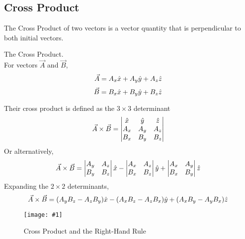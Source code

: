 \documentclass[11pt]{article}
\newcommand{\fig}[4]{
    \begin{figure}[H]
        \centering
        \texttt{[image: \#1]}
        \caption{#2}
        \label{exp4fit}
    \end{figure}
}
\theoremstyle{gangnamstyle}{\newtheorem{definition}{Definition}[]}
\theoremstyle{gangnamstyle}{\newtheorem{example}{Example}[]}
\theoremstyle{gangnamstyle}{\newtheorem{problem}{Problem}[]}
\begin{document}
\subsection{Cross Product}

The Cross Product of two vectors is a vector quantity that is perpendicular to both initial vectors. 

\begin{definition}
The Cross Product. \\
For vectors $\Vec{A}$ and $\Vec{B}$, 
\begin{equation}
\Vec{A} = A_x\Hat{x} + A_y\Hat{y} + A_z\Hat{z}
\end{equation}
\begin{equation}
\Vec{B} = B_x\Hat{x} + B_y\Hat{y} + B_z\Hat{z}
\end{equation}

Their cross product is defined as the $3 \times 3$ determinant
\begin{equation}
\Vec{A} \times \Vec{B} = 
\begin{vmatrix}
\Hat{x} & \Hat{y} & \Hat{z} \\
A_x & A_y & A_z \\
B_x & B_y & B_z
\end{vmatrix}
\end{equation}
Or alternatively, 
\begin{equation}
\Vec{A} \times \Vec{B} = 
\begin{vmatrix}
A_y & A_z \\
B_y & B_z
\end{vmatrix} \Hat{x}
- 
\begin{vmatrix}
A_x & A_z \\
B_x & B_z
\end{vmatrix} \Hat{y}
+ 
\begin{vmatrix}
A_x & A_y \\
B_x & B_y
\end{vmatrix} \Hat{z}
\end{equation}
Expanding the $2 \times 2$ determinants, 
\begin{equation}
\Vec{A} \times \Vec{B} = (A_yB_z - A_zB_y) \Hat{x} - (A_xB_z - A_zB_x) \Hat{y} + (A_xB_y - A_yB_x) \Hat{z}
\end{equation}
\end{definition}

\fig{figs/n0/times.png}{Cross Product and the Right-Hand Rule}{0.5}{0} 
\end{document}
